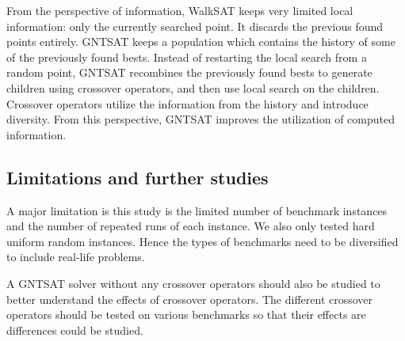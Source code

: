 From the perspective of information, WalkSAT keeps very limited local
information: only the currently searched point. It discards the previous found
points entirely. GNTSAT keeps a population which contains the history of some
of the previously found bests. Instead of restarting the local search from a
random point, GNTSAT recombines the previously found bests to generate
children using crossover operators, and then use local search on the children.
Crossover operators utilize the information from the history and introduce
diversity. From this perspective, GNTSAT improves the utilization of computed
information.

\subsection{Limitations and further studies}
A major limitation is this study is the limited number of benchmark instances
and the number of repeated runs of each instance. We also only tested hard
uniform random instances. Hence the types of benchmarks need to be diversified
to include real-life problems.

A GNTSAT solver without any crossover operators should also be studied to
better understand the effects of crossover operators. The different crossover
operators should be tested on various benchmarks so that their effects are
differences could be studied.
